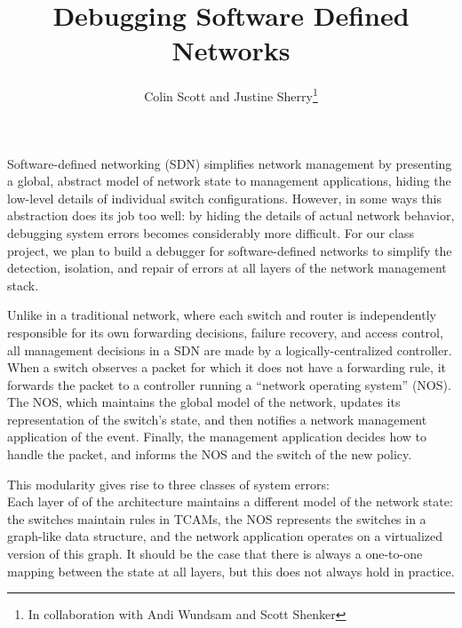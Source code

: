 \documentclass{sig-alternate-10pt}
\title{Debugging Software Defined Networks\vspace{-25pt}}
\author{Colin Scott and Justine Sherry\thanks{In collaboration with Andi
Wundsam and Scott Shenker}\vspace{-15pt}}
\date{}
\begin{document}
    \maketitle
    \thispagestyle{empty}
%
%
%
%  

Software-defined networking (SDN) simplifies network management by presenting a
global, abstract model of network state to management applications, hiding
the low-level details of individual switch configurations. However, in some ways this abstraction does
its job too well: by hiding the details of actual network behavior, debugging
system errors becomes considerably more difficult.
For our class project, we plan to build a debugger for software-defined networks to
simplify the detection, isolation, and repair of errors at all layers of
the network management stack.

Unlike in a traditional network, where each switch and router is independently responsible for
its own forwarding decisions, failure recovery, and access control, all management
decisions in a SDN are made by a logically-centralized controller. When a
switch observes a packet for which it does not have a forwarding rule,
it forwards the packet to a controller running a ``network operating system''
(NOS). The NOS, which maintains the global model of the network, updates its representation
of the switch's state, and then notifies a network management application of the event.
Finally, the management application decides how to handle the packet, and informs the NOS
and the switch of the new policy.

This modularity gives rise to three classes of system errors: \\
Each layer of of the architecture maintains a different model of the network state: the
switches maintain rules in TCAMs, the NOS represents the switches
in a graph-like data structure, and the network application operates on 
a virtualized version of this graph. It should be
the case that there is always a one-to-one mapping between the state at all
layers, but this does not always hold in practice.
\end{document}
